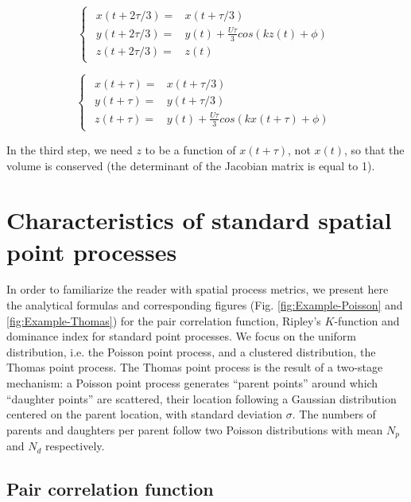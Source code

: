\documentclass[english]{article}
\begin{document}
\begin{equation}
\begin{cases}
\begin{array}{cc}
x(t+2\tau/3)= & x(t+\tau/3)\\
y(t+2\tau/3)= & y(t)+\frac{U\tau}{3}cos(kz(t)+\phi)\\
z(t+2\tau/3)= & z(t)
\end{array}\end{cases}\label{eq:step2_pierrehumbert}
\end{equation}

\begin{equation}
\begin{cases}
\begin{array}{cc}
x(t+\tau)= & x(t+\tau/3)\\
y(t+\tau)= & y(t+\tau/3)\\
z(t+\tau)= & y(t)+\frac{U\tau}{3}cos(kx(t+\tau)+\phi)
\end{array}\end{cases}\label{eq:step3_pierrehumbert}
\end{equation}

In the third step, we need $z$ to be a function of $x(t+\tau)$,
not $x(t)$, so that the volume is conserved (the determinant of the
Jacobian matrix is equal to 1).

\section{Characteristics of standard spatial point processes}

In order to familiarize the reader with spatial process metrics, we
present here the analytical formulas and corresponding figures (Fig.
\ref{fig:Example-Poisson} and \ref{fig:Example-Thomas}) for the
pair correlation function, Ripley's $K$-function and dominance index
for standard point processes. We focus on the uniform distribution,
i.e. the Poisson point process, and a clustered distribution, the
Thomas point process. The Thomas point process is the result of a
two-stage mechanism: a Poisson point process generates ``parent points''
around which ``daughter points'' are scattered, their location following
a Gaussian distribution centered on the parent location, with standard
deviation $\sigma$. The numbers of parents and daughters per parent
follow two Poisson distributions with mean $N_{p}$ and $N_{d}$ respectively.

\subsection{Pair correlation function}
\end{document}
